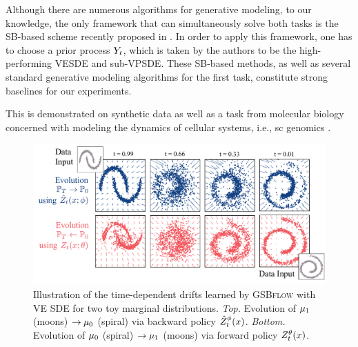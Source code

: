 Although there are numerous algorithms for generative modeling, to our knowledge, the only framework that can simultaneously solve both tasks is the \acrshort{SB}-based scheme recently proposed in \citep{chen2021likelihood}. In order to apply this framework, one has to choose a prior process $Y_{ t }$, which is taken by the authors to be the high-performing \acrshort{VESDE} and sub-\acrshort{VPSDE}. These \acrshort{SB}-based methods, as well as several standard generative modeling algorithms \citep{ho2020denoising, sohl2015deep, song2020score, huang2021variational, song2019generative, song2020score} for the first task, constitute strong baselines for our experiments.

This is demonstrated on synthetic data as well as a task from molecular biology concerned with modeling the dynamics of cellular systems, i.e., \acrlong{sc} genomics \citep{macosko2015highly, frangieh2021multimodal, kulkarni2019beyond}.

\begin{figure}[ht]
	\centering
	\includegraphics[width=0.8\linewidth]{figures/fig_pred_gsbve_toy_spiral_moon.pdf}
	\caption{Illustration of the time-dependent drifts learned by \textsc{GSBflow} with VE SDE for two toy marginal distributions. \emph{Top.} Evolution of $\mu_1$ (moons) $\rightarrow \mu_0$ (spiral) via backward policy {\color{blue} $\SBb$}. \emph{Bottom.} Evolution of $\mu_0$ (spiral) $\rightarrow \mu_1$ (moons) via forward policy {\color{pink} $\SBf$}.}
	\label{fig:res_synthetic}
\end{figure}

